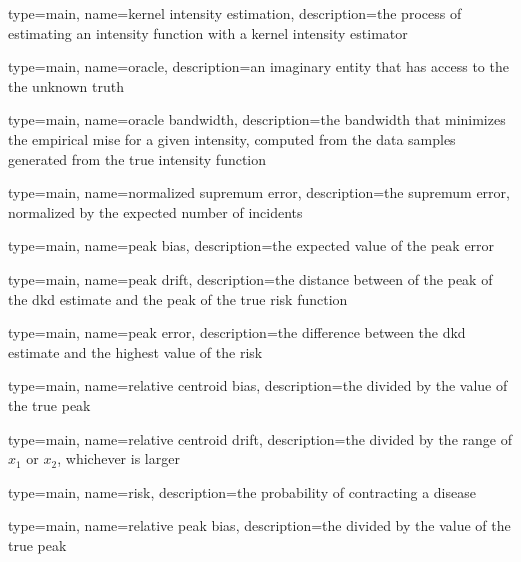 {
   type=main,
   name={kernel intensity estimation},
   description={the process of estimating an intensity function with a kernel intensity estimator}
}

{
   type=main,
   name={oracle},
   description={an imaginary entity that has access to the the unknown truth}
}

{
   type=main,
   name={oracle bandwidth},
   description={the bandwidth that minimizes the empirical \acrshort{mise} for a given \gls{intensity}, computed from the data samples generated from the true intensity function}
}

{%
   type=main,
   name={normalized supremum error},
   description={the supremum error, normalized by the expected number of incidents}
}

{%
   type=main,
   name={peak bias},
   description={the expected value of the peak error}
}

{%
   type=main,
   name={peak drift},
   description={the distance between of the peak of the dkd estimate and the peak of the true risk function}
}

{%
   type=main,
   name={peak error},
   description={the difference between the dkd estimate and the highest value of the risk}
}

{%
   type=main,
   name={relative centroid bias},
   description={the  divided by the value of the true peak}
}

{%
   type=main,
   name={relative centroid drift},
   description={the  divided by the range of \ensuremath{x_1} or \ensuremath{x_2}, whichever is larger}
}

{
   type=main,
   name={risk},
   description={the probability of contracting a disease}
}

{%
   type=main,
   name={relative peak bias},
   description={the  divided by the value of the true peak}
}

